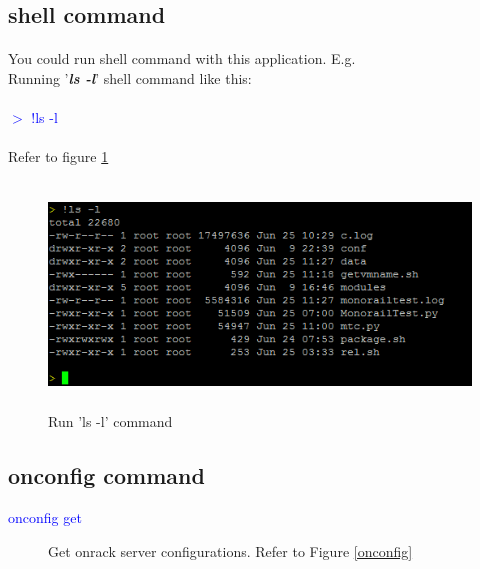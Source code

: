 \documentclass [12pt, a4paper, titlepage]{article}
\begin{document}
\subsection {shell command}
         \paragraph[indent]{} You could run shell command with this application. E.g.\\
         Running '\textbf{\textit{ls -l}}' shell command like this: \\\\
         \textcolor{blue}{$>$ !ls -l} \\\\
         Refer to figure \ref{shell}

         \begin{figure}[H]
         \begin{center}
         \includegraphics[width=13cm,height=6cm]{png/shell}
         \end{center}
         \caption{Run 'ls -l' command}
         \label{shell}
         \end{figure}


\subsection {onconfig command}
        \begin{description}
            \item[\textcolor{blue}{onconfig get}] Get onrack server configurations. Refer to Figure \ref{onconfig}
        \end{description}
\end{document}
